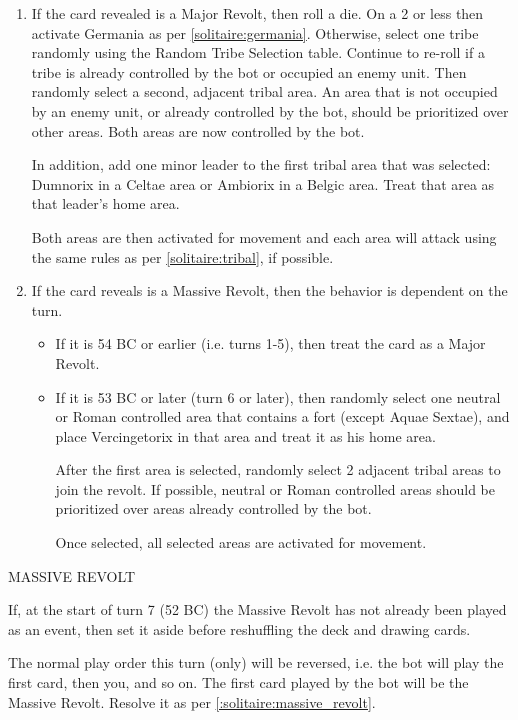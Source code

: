\begin{enumerate}
\begin{enumerate}[leftmargin=0in]
    \item If the card revealed is a Major Revolt, then roll a die. On a 2 or less then activate Germania as per \ref{solitaire:germania}. Otherwise, select one tribe randomly using the Random Tribe Selection table. Continue to re-roll if a tribe is already controlled by the bot or occupied an enemy unit. Then randomly select a second, adjacent tribal area. An area that is not occupied by an enemy unit, or already controlled by the bot, should be prioritized over other areas. Both areas are now controlled by the bot.
  
    In addition, add one minor leader to the first tribal area that was selected: Dumnorix in a Celtae area or Ambiorix in a Belgic area. Treat that area as that leader's home area.
  
    Both areas are then activated for movement and each area will attack using the same rules as per \ref{solitaire:tribal}, if possible.
  
    \item If the card reveals is a Massive Revolt, then the behavior is dependent on the turn.
    \begin{itemize}
      \item If it is 54 BC or earlier (i.e. turns 1-5), then treat the card as a Major Revolt.
      \item \label{:solitaire:massive_revolt}If it is 53 BC or later (turn 6 or later), then randomly select one neutral or Roman controlled area that contains a fort (except Aquae Sextae), and place Vercingetorix in that area and treat it as his home area.
      
      After the first area is selected, randomly select 2 adjacent tribal areas to join the revolt. If possible, neutral or Roman controlled areas should be prioritized over areas already controlled by the bot.
      
      Once selected, all selected areas are activated for movement.
    \end{itemize}
  \end{enumerate}
\end{enumerate}
  
MASSIVE REVOLT

If, at the start of turn 7 (52 BC) the Massive Revolt has not already been played as an event, then set it aside before reshuffling the deck and drawing cards.
  
The normal play order this turn (only) will be reversed, i.e. the bot will play the first card, then you, and so on. The first card played by the bot will be the Massive Revolt. Resolve it as per \ref{:solitaire:massive_revolt}.
  
